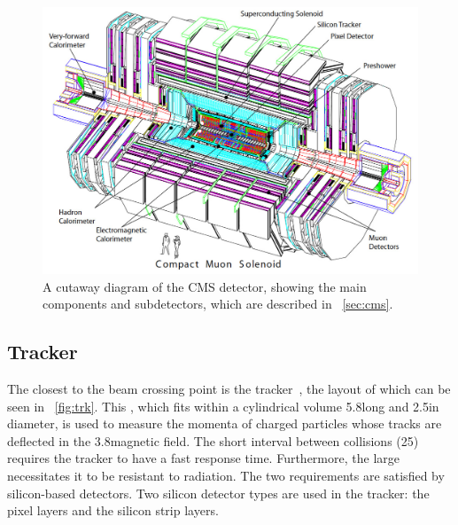 \begin{figure}[h]
\centering
\includegraphics[width=1.0\textwidth]{detectorFigures/cms-perspective.png}
\caption{A cutaway diagram of the CMS detector, showing the main components and subdetectors, which are described in \Sec~\ref{sec:cms}\quad\cite{CMSTDR}.}
\label{fig:cms-exploded}
\end{figure}

\subsection{Tracker}
\label{sec:cms:tracker}

The closest \subdetector to the beam crossing point is the tracker~\cite{CMSTrackerTDR}, the layout of which can be seen in \Fig~\ref{fig:trk}. This \subdetector, which fits within a cylindrical volume 5.8\m long and 2.5\m in diameter, is used to measure the momenta of charged particles whose tracks are deflected in the 3.8\T magnetic field. 
The short interval between collisions (25\ns) requires the tracker to have a fast response time. Furthermore, the large \pp \crosssection necessitates it to be resistant to radiation. The two requirements are satisfied by silicon-based detectors. Two silicon detector types are used in the \CMS tracker: the pixel layers and the silicon strip layers.



